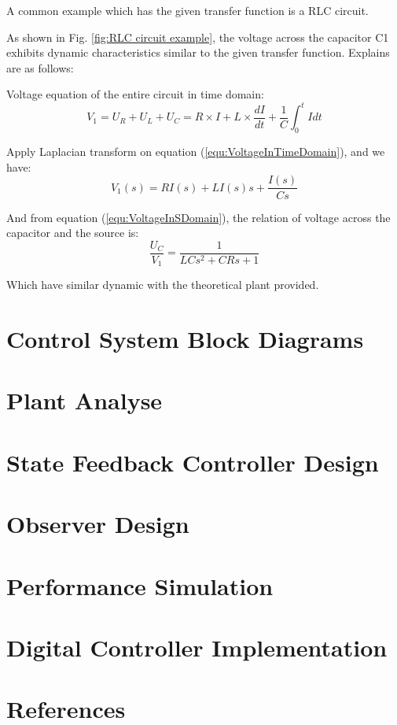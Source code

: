 \documentclass[12pt, oneside]{article}
\begin{document}
A common example which has the given transfer function is a RLC circuit.

As shown in Fig. \ref{fig:RLC circuit example}, the voltage across the capacitor C1 exhibits dynamic characteristics similar to the given transfer function. Explains are as follows:

\vspace{0.2cm}
Voltage equation of the entire circuit in time domain:
\begin{equation}
    V_1 = U_R+U_L+U_C = R\times I+L\times \frac{dI}{dt}+\frac{1}{C}\int_0^t Idt
    \label{equ:VoltageInTimeDomain}
\end{equation}

Apply Laplacian transform on equation (\ref{equ:VoltageInTimeDomain}), and we have:
\begin{equation}
        V_1(s) = RI(s)+ LI(s)s+\frac{I(s)}{Cs}
        \label{equ:VoltageInSDomain}
\end{equation}

And from equation (\ref{equ:VoltageInSDomain}), the relation of voltage across the capacitor and the source is:
\begin{equation}
    \frac{U_C}{V_1}=\frac{1}{LCs^2+CRs+1}
\end{equation}

Which have similar dynamic with the theoretical plant provided.













\section{Control System Block Diagrams}
\section{Plant Analyse}
\section{State Feedback Controller Design}
\section{Observer Design}
\section{Performance Simulation}
\section{Digital Controller Implementation}
\section{References}
\end{document}

